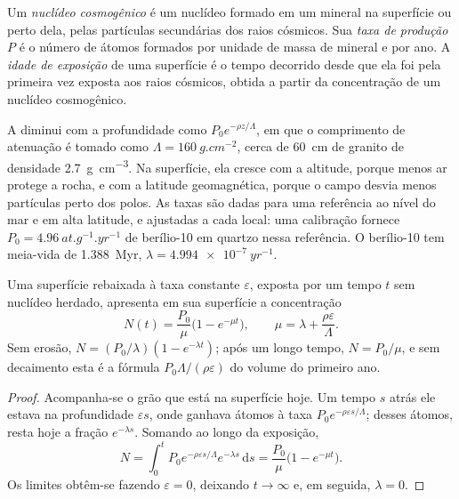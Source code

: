 \begin{definition}
\label{def:b3:advanced-geochronology:cosmogenic}
Um \emph{nuclídeo cosmogênico} é um nuclídeo
formado em um mineral na superfície ou perto dela, pelas partículas secundárias dos raios cósmicos. Sua
\emph{taxa de produção} $P$ é o número
de átomos formados por unidade de massa de mineral e por ano. A \emph{idade de
exposição} de uma superfície é o tempo decorrido desde que ela foi pela primeira vez exposta
aos raios cósmicos, obtida a partir da concentração de um nuclídeo cosmogênico.
\end{definition}

A  diminui com a profundidade como $P_0e^{-\rho z/\Lambda}$, em
que o comprimento de atenuação é tomado como $\Lambda = \qty{160}{g.cm^{-2}}$, cerca de
\qty{60}{cm} de granito de densidade \qty{2.7}{g.cm^{-3}}. Na superfície, ela
cresce com a altitude, porque menos ar protege a rocha, e com a
latitude geomagnética, porque o campo desvia menos partículas perto dos
polos. As taxas são dadas para uma referência ao nível do mar e em alta latitude, e
ajustadas a cada local: uma calibração fornece $P_0 = \qty{4.96}{at.g^{-1}.yr^{-1}}$
de berílio-10 em quartzo nessa referência. O berílio-10 tem meia-vida de
\qty{1.388}{Myr}, $\lambda = \qty{4.994e-7}{yr^{-1}}$.

\begin{theorem}\label{thm:b3:advanced-geochronology:exposure}
Uma superfície rebaixada à taxa constante $\varepsilon$, exposta por um tempo $t$
sem nuclídeo herdado, apresenta em sua superfície a concentração
\[
N(t) = \frac{P_0}{\mu}\bigl(1 - e^{-\mu t}\bigr), \qquad
\mu = \lambda + \frac{\rho\varepsilon}{\Lambda}.
\]
Sem erosão, $N = (P_0/\lambda)(1 - e^{-\lambda t})$; após um longo tempo,
$N = P_0/\mu$, e sem decaimento esta é a fórmula $P_0\Lambda/(\rho\varepsilon)$
do volume do primeiro ano.
\end{theorem}

\begin{proof}
Acompanha-se o grão que está na superfície hoje. Um tempo $s$ atrás ele estava na
profundidade $\varepsilon s$, onde ganhava átomos à taxa $P_0e^{-\rho\varepsilon
s/\Lambda}$; desses átomos, resta hoje a fração $e^{-\lambda s}$. Somando
ao longo da exposição,
\[
N = \int_0^t P_0e^{-\rho\varepsilon s/\Lambda}e^{-\lambda s}\,\mathrm ds
= \frac{P_0}{\mu}\bigl(1 - e^{-\mu t}\bigr).
\]
Os limites obtêm-se fazendo $\varepsilon = 0$, deixando $t \to \infty$ e, em
seguida, $\lambda = 0$.
\end{proof}

